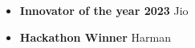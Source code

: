 \begin{itemize}[leftmargin=*,itemsep=0.0em]
    \item \textbf{Innovator of the year 2023} Jio
    \item \textbf{Hackathon Winner} Harman
\end{itemize}